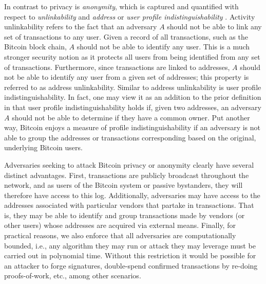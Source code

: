 In contrast to privacy is \emph{anonymity}, which is captured and quantified with respect to \emph{unlinkability} and \emph{address} or \emph{user profile indistinguishability} \cite{Androulaki12-privacy}. Activity unlinkability refers to the fact that an adversary $A$ should not be able to link any set of transactions to any user. Given a record of all transactions, such as the Bitcoin block chain, $A$ should not be able to identify any user. This is a much stronger security notion as it protects all users from being identified from any set of transactions. Furthermore, since transactions are linked to addresses, $A$ should not be able to identify any user from a given set of addresses; this property is referred to as address unlinkability. Similar to address unlinkability is user profile indistinguishability. In fact, one may view it as an addition to the prior definition in that user profile indistinguishability holds if, given two addresses, an adversary $A$ should not be able to determine if they have a common owner. Put another way, Bitcoin enjoys a measure of profile indistinguishability if an adversary is not able to group the addresses or transactions corresponding based on the original, underlying Bitcoin users. 

Adversaries seeking to attack Bitcoin privacy or anonymity clearly have several distinct advantages. First, transactions are publicly broadcast throughout the network, and as users of the Bitcoin system or passive bystanders, they will therefore have access to this log. Additionally, adversaries may have access to the addresses associated with particular vendors that partake in transactions. That is, they may be able to identify and group transactions made by vendors (or other users) whose addresses are acquired via external means. Finally, for practical reasons, we also enforce that all adversaries are computationally bounded, i.e., any algorithm they may run or attack they may leverage must be carried out in polynomial time. Without this restriction it would be possible for an attacker to forge signatures, double-spend confirmed transactions by re-doing proofs-of-work, etc., among other scenarios. 

